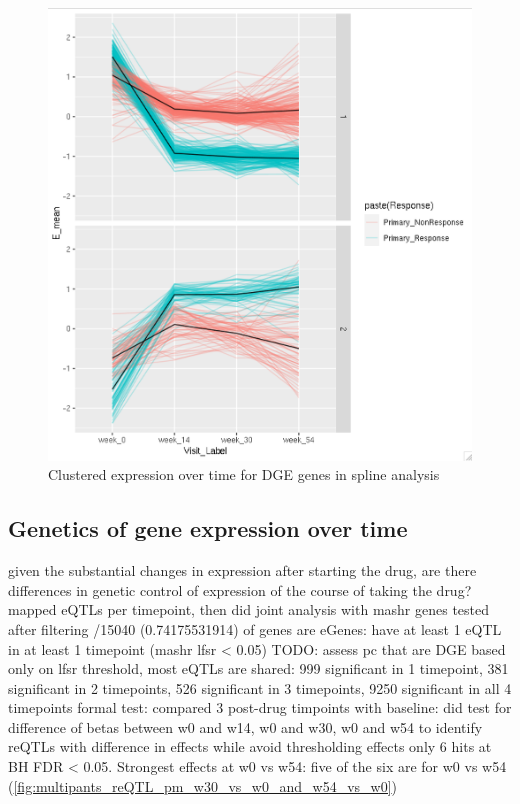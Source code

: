 \begin{outline}
\begin{figure}
    \centering
    \includegraphics[width=1.0\textwidth,page=1]{mainmatter/figures/chapter_04/Screenshot 2020-08-06 at 16.09.43.png}
    \caption{Clustered expression over time for DGE genes in spline analysis}
    \label{fig:multipants_dge_spline1}
\end{figure}
    
\subsection{Genetics of gene expression over time}

\1 given the substantial changes in expression after starting the drug, are there differences in genetic control of expression of the course of taking the drug? 
\1 mapped eQTLs per timepoint, then did joint analysis with mashr
     genes tested after filtering
    /15040 (0.74175531914) of genes are eGenes: have at least 1 eQTL in at least 1 timepoint (mashr lfsr < 0.05)
    \2 TODO: assess pc that are DGE
\1 based only on lfsr threshold, most eQTLs are shared: 999 significant in 1 timepoint, 381 significant in 2 timepoints, 526 significant in 3 timepoints, 9250 significant in all 4 timepoints
    \2 formal test: compared 3 post-drug timpoints with baseline: did test for difference of betas between w0 and w14, w0 and w30, w0 and w54 to identify reQTLs with difference in effects while avoid thresholding effects
    \2 only 6 hits at BH FDR < 0.05. Strongest effects at w0 vs w54: five of the six are for w0 vs w54 (\autoref{fig:multipants_reQTL_pm_w30_vs_w0_and_w54_vs_w0})


\end{outline}
